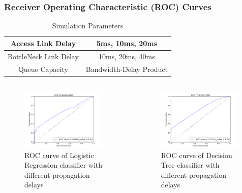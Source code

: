 \documentclass{beamer}
\begin{document}
\begin{frame}
\frametitle{Receiver Operating Characteristic (ROC) Curves}
\begin{table}
\begin{center}
\caption {Simulation Parameters} \label{tab:varyRTT}
\begin{tabular}{ |c|c| }
 \hline
 Access Link Delay & 5ms, 10ms, 20ms  \\
 \hline
 BottleNeck Link Delay & 10ms, 20ms, 40ms\\
 \hline
 Queue Capacity & Bandwidth-Delay Product\\
 \hline
\end{tabular}
\end{center}
\end{table}
 \begin{columns}[c]
\begin{figure}
\includegraphics[width=4cm]{LRRocDiffProp.png}
\caption{ROC curve of Logistic Regression classifier with different propagation delays}
\label{LRROCDiff}
\end{figure}
\begin{figure}
\includegraphics[width=4cm]{DTRocDiffProp.png}
\caption{ROC curve of Decision Tree classifier with different propagation delays}
\label{DTROCDiff}
\end{figure}
\end{columns}


\end{frame}
\end{document}
